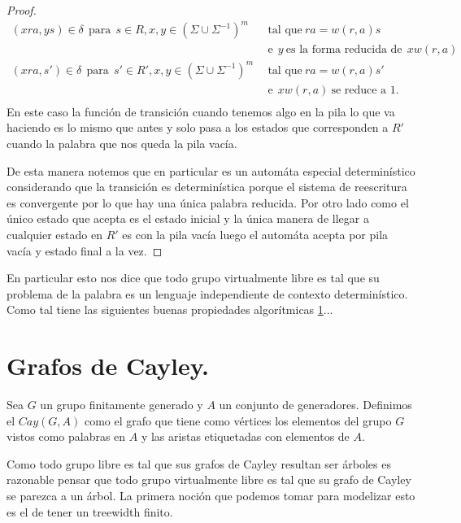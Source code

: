 \documentclass[tesis.tex]{subfiles}
\newcommand{\fg}{grupo finitamente generado }
\begin{document}
\begin{proof}
	\begin{align*}
	(xra,ys) \in \delta \ \ \text{para} \ \  s \in R, x,y \in (\Sigma \cup \Sigma^{-1})^m & \ \  \text{tal que} \ ra=w(r,a)s  \\ & \ \ \text{e} \ \ y \ \text{es la forma reducida de} \ \ xw(r,a)  \\
	(xra,s') \in \delta\ \ \text{para} \ \  s' \in R', x,y \in (\Sigma \cup \Sigma^{-1})^m & \ \  \text{tal que} \ ra=w(r,a)s'  \\ & \ \ \text{e}  \ \ xw(r,a)  \ \text{se reduce a 1}. \ \  \\ 
	\end{align*}
	En este caso la función de transición cuando tenemos algo en la pila lo que va haciendo es lo mismo que antes y solo pasa a los estados que corresponden a $R'$ cuando la palabra que nos queda la pila vacía. 
	
	De esta manera notemos que en particular es un automáta especial determinístico considerando que la transición es determinística porque el sistema de reescritura es convergente por lo que hay una única palabra reducida. Por otro lado como el único estado que acepta es el estado inicial y la única manera de llegar a cualquier estado en $R'$ es con la pila vacía luego el automáta acepta por pila vacía y estado final a la vez.
\end{proof}

\begin{obs}
	En particular esto nos dice que todo grupo virtualmente libre es tal que su problema de la palabra es un lenguaje independiente de contexto determinístico. Como tal tiene las siguientes buenas propiedades algorítmicas \ref{}...
\end{obs}



\section{Grafos de Cayley.}

\begin{deff}
	Sea $G$ un \fg y $A$ un conjunto de generadores. Definimos el  $Cay(G,A)$ como el grafo que tiene como vértices los elementos del grupo $G$ vistos como palabras en $A$ y las aristas etiquetadas con elementos de $A$. 
\end{deff}

Como todo grupo libre es tal que sus grafos de Cayley resultan ser árboles es razonable pensar que todo grupo virtualmente libre es tal que su grafo de Cayley se parezca a un árbol. La primera noción que podemos tomar para modelizar esto es el de tener un treewidth finito.
\end{document}
